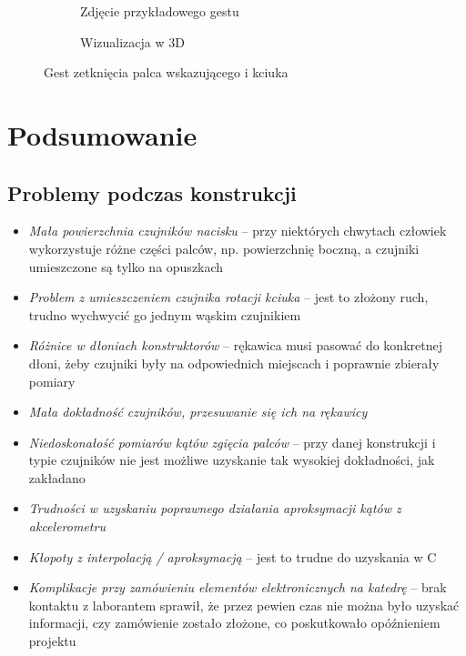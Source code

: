\documentclass[12pt,a4paper]{article}
\begin{document}
\begin{figure}[ht!]
\centering
\begin{subfigure}{.5\textwidth}
	\centering
	\caption{Zdjęcie przykładowego gestu}
	\label{fig:zetkniecie_palcow_foto}
\end{subfigure}%
\begin{subfigure}{.5\textwidth}
	\centering
	\caption{Wizualizacja w 3D}
	\label{fig:zetkniecie_palcow_3D}
\end{subfigure}
\caption{Gest zetknięcia palca wskazującego i kciuka}
\label{fig:zetkniecie_palcow}
\end{figure}


\section{Podsumowanie}
\subsection{Problemy podczas konstrukcji}
\begin{itemize}
\item \textit{Mała powierzchnia czujników nacisku} -- przy niektórych chwytach człowiek wykorzystuje różne części palców, np. powierzchnię boczną, a czujniki umieszczone są tylko na opuszkach
\item \textit{Problem z umieszczeniem czujnika rotacji kciuka} -- jest to złożony ruch, trudno wychwycić go jednym wąskim czujnikiem
\item \textit{Różnice w dłoniach konstruktorów} -- rękawica musi pasować do konkretnej dłoni, żeby czujniki były na odpowiednich miejscach i poprawnie zbierały pomiary
\item \textit{Mała dokładność czujników, przesuwanie się ich na rękawicy}
\item \textit{Niedoskonałość pomiarów kątów zgięcia palców} -- przy danej konstrukcji i typie czujników nie jest możliwe uzyskanie tak wysokiej dokładności, jak zakładano
\item \textit{Trudności w uzyskaniu poprawnego działania aproksymacji kątów z akcelerometru}
\item \textit{Kłopoty z interpolacją / aproksymacją} -- jest to trudne do uzyskania w C
\item \textit{Komplikacje przy zamówieniu elementów elektronicznych na katedrę} -- brak kontaktu z laborantem sprawił, że przez pewien czas nie można było uzyskać informacji, czy zamówienie zostało złożone, co poskutkowało opóźnieniem projektu
\end{itemize}
\end{document}

